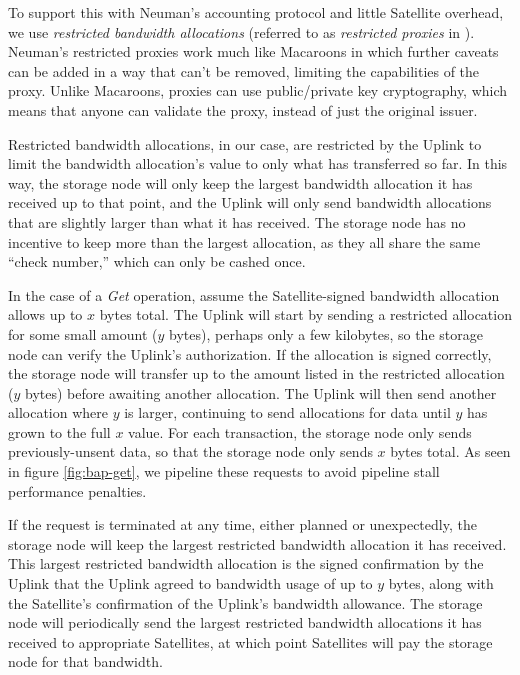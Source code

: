 \documentclass[8pt,fleqn,openany]{book}
\begin{document}
To support this with Neuman's accounting protocol and little Satellite overhead,
we use {\em restricted bandwidth allocations}
(referred to as {\em restricted proxies} in \cite{proxy-accounting}).
Neuman's restricted proxies work much like Macaroons
\cite{macaroons} in which further caveats can be added in a way that can't be
removed, limiting the capabilities of the proxy. Unlike Macaroons, proxies
can use public/private key cryptography, which means that anyone can validate
the proxy, instead of just the original issuer.

Restricted bandwidth allocations, in our case, are restricted by the Uplink to
limit the bandwidth allocation's value to only what has transferred so far.
In this way, the storage node will only keep the largest bandwidth allocation
it has received up to that point, and the Uplink will only send bandwidth allocations
that are slightly larger than what it has received.
The storage node has no incentive to keep more than the largest allocation, as
they all share the same ``check number,'' which can only be cashed once.

In the case of a {\em Get} operation, assume the Satellite-signed bandwidth
allocation allows up to $x$ bytes total. The Uplink
will start by sending a restricted allocation for some small amount ($y$ bytes),
perhaps only a few kilobytes,
so the storage node can verify the Uplink's authorization.
If the allocation is signed correctly, the storage node will
transfer up to the amount listed in the restricted allocation ($y$ bytes) before
awaiting another allocation. The Uplink will then send another allocation where
$y$ is larger, continuing to send allocations for data until $y$ has grown to
the full $x$ value.
For each transaction, the storage node only sends previously-unsent data,
so that the storage node only sends $x$ bytes total.
As seen in figure \ref{fig:bap-get},
we pipeline these requests to avoid pipeline stall performance penalties.

If the request is terminated at any time,
either planned or unexpectedly,
the storage node will keep the largest restricted bandwidth allocation it has
received.
This largest restricted bandwidth allocation is the signed confirmation
by the Uplink that the Uplink agreed to bandwidth usage of up to $y$
bytes, along with the Satellite's confirmation of the Uplink's bandwidth
allowance.
The storage node will periodically send the largest restricted bandwidth
allocations it has received to appropriate Satellites, at which point
Satellites will pay the storage node for that bandwidth.
\end{document}
